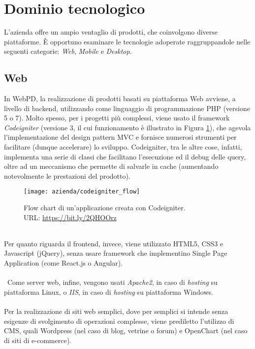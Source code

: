 \section{Dominio tecnologico}
L'azienda offre un ampio ventaglio di prodotti, che coinvolgono diverse piattaforme. È opportuno esaminare le tecnologie adoperate raggruppandole nelle seguenti categorie: \textit{Web}, \textit{Mobile} e \textit{Desktop}.

\subsection{Web}
In WebPD, la realizzazione di prodotti basati su piattaforma Web avviene, a livello di backend, utilizzando come linguaggio di programmazione PHP (versione 5 o 7). Molto spesso, per i progetti più complessi, viene usato il framework \textit{Codeigniter} (versione 3, il cui funzionamento è illustrato in Figura \ref{figura:flow-chart-codeigniter}), che agevola l'implementazione del design pattern MVC e fornisce numerosi strumenti per facilitare (dunque accelerare) lo sviluppo. Codeigniter, tra le altre cose, infatti, implementa una serie di classi che facilitano l'esecuzione ed il debug delle query, oltre ad un meccanismo che permette di salvarle in cache (aumentando notevolmente le prestazioni del prodotto).\\
\begin{figure}[!h] 
	\centering 
	\texttt{[image: azienda/codeigniter\_flow]} 
	\caption{Flow chart di un'applicazione creata con Codeigniter.\\URL: \url{https://bit.ly/2QHOOrz}}
	\label{figura:flow-chart-codeigniter}
\end{figure}\\
Per quanto riguarda il frontend, invece, viene utilizzato HTML5, CSS3 e Javascript (jQuery), senza usare framework che implementino Single Page Application (come React.js o Angular).\\\\\
Come server web, infine, vengono usati \textit{Apache2}, in caso di \textit{hosting} su piattaforma Linux, o  \textit{IIS}, in caso di \textit{hosting} su piattaforma Windows.\\\\
Per la realizzazione di siti web semplici, dove per semplici si intende senza esigenze di svolgimento di operazioni complesse, viene prediletto l'utilizzo di CMS, quali Wordpress (nel caso di blog, vetrine o forum) e OpenChart (nel caso di siti di e-commerce).
\\
\\
